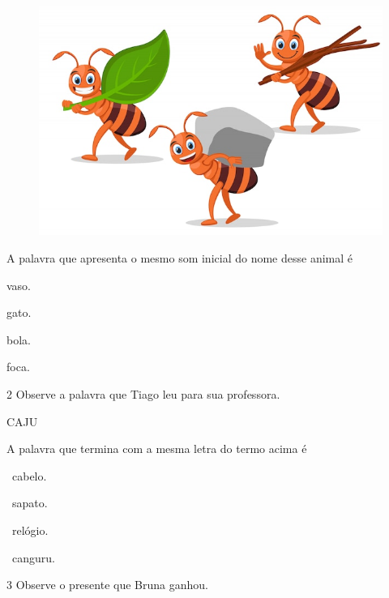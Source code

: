 \begin{figure}[htpb!]
\centering
\includegraphics[width=\textwidth]{media/image42.jpeg}
\end{figure}

A palavra que apresenta o mesmo som inicial do nome desse animal é

\begin{escolha}[itemsep=-3pt]
\item vaso.

\item gato.

\item bola.

\item foca.
\end{escolha}


\num{2} Observe a palavra que Tiago leu para sua professora.

\begin{myquote}
\centering
CAJU
\end{myquote}

A palavra que termina com a mesma letra do termo acima é

\begin{escolha}[itemsep=-3pt]
\item\ cabelo.

\item\ sapato.

\item\ relógio.

\item\ canguru.
\end{escolha}


\num{3} Observe o presente que Bruna ganhou.

